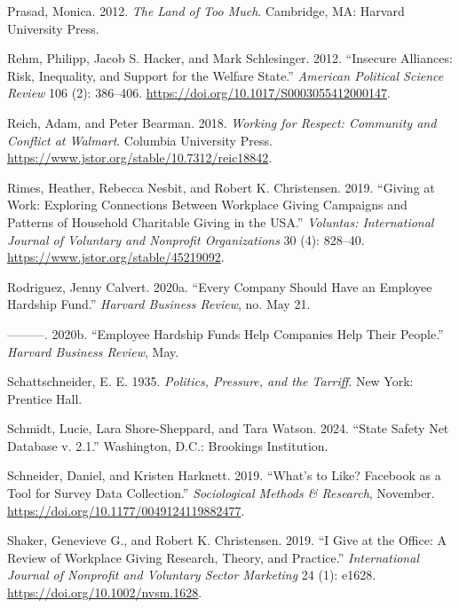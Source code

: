 \documentclass[
  11pt,
  oneside]{article}
\newlength{\cslhangindent}
\newenvironment{CSLReferences}[2] %
 {\begin{list}{}{%
  \setlength{\itemindent}{0pt}
  \setlength{\leftmargin}{0pt}
  \setlength{\parsep}{0pt}
  \ifodd #1
   \setlength{\leftmargin}{\cslhangindent}
   \setlength{\itemindent}{-1\cslhangindent}
  \fi
  \setlength{\itemsep}{#2\baselineskip}}}
 {\end{list}}
\begin{document}
\begin{CSLReferences}{1}{0}
Prasad, Monica. 2012. \emph{The {Land} of {Too Much}}. Cambridge, MA: Harvard University Press.

Rehm, Philipp, Jacob S. Hacker, and Mark Schlesinger. 2012. {``Insecure {Alliances}: {Risk}, {Inequality}, and {Support} for the {Welfare State}.''} \emph{American Political Science Review} 106 (2): 386--406. \url{https://doi.org/10.1017/S0003055412000147}.

Reich, Adam, and Peter Bearman. 2018. \emph{Working for {Respect}: {Community} and {Conflict} at {Walmart}}. Columbia University Press. \url{https://www.jstor.org/stable/10.7312/reic18842}.

Rimes, Heather, Rebecca Nesbit, and Robert K. Christensen. 2019. {``Giving at {Work}: {Exploring Connections Between Workplace Giving Campaigns} and {Patterns} of {Household Charitable Giving} in the {USA}.''} \emph{Voluntas: International Journal of Voluntary and Nonprofit Organizations} 30 (4): 828--40. \url{https://www.jstor.org/stable/45219092}.

Rodriguez, Jenny Calvert. 2020a. {``Every {Company Should Have} an {Employee Hardship Fund}.''} \emph{Harvard Business Review}, no. May 21.

---------. 2020b. {``Employee {Hardship Funds Help Companies Help Their People}.''} \emph{Harvard Business Review}, May.

Schattschneider, E. E. 1935. \emph{Politics, {Pressure}, and the {Tarriff}}. New York: Prentice Hall.

Schmidt, Lucie, Lara Shore-Sheppard, and Tara Watson. 2024. {``State {Safety Net Database} v. 2.1.''} Washington, D.C.: Brookings Institution.

Schneider, Daniel, and Kristen Harknett. 2019. {``What's to {Like}? {Facebook} as a {Tool} for {Survey Data Collection}.''} \emph{Sociological Methods \& Research}, November. \url{https://doi.org/10.1177/0049124119882477}.

Shaker, Genevieve G., and Robert K. Christensen. 2019. {``I Give at the Office: {A} Review of Workplace Giving Research, Theory, and Practice.''} \emph{International Journal of Nonprofit and Voluntary Sector Marketing} 24 (1): e1628. \url{https://doi.org/10.1002/nvsm.1628}.


\end{CSLReferences}
\end{document}
